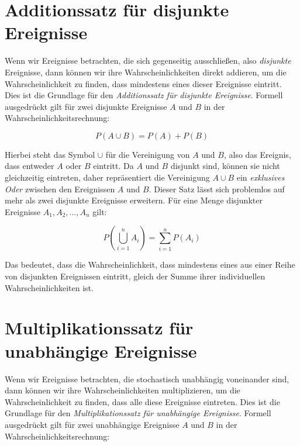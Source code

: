 \section{Additionssatz für disjunkte Ereignisse}
Wenn wir Ereignisse betrachten, die sich gegenseitig ausschließen, also \textit{disjunkte} Ereignisse, dann können wir ihre Wahrscheinlichkeiten direkt addieren, um die Wahrscheinlichkeit zu finden, dass mindestens eines dieser Ereignisse eintritt.
Dies ist die Grundlage für den \textit{Additionssatz für disjunkte Ereignisse}.
\newline \newline
Formell ausgedrückt gilt für zwei disjunkte Ereignisse $A$ und $B$ in der Wahrscheinlichkeitsrechnung:

\begin{equation}
    P(A \cup B) = P(A) + P(B)
\end{equation}

Hierbei steht das Symbol $\cup$ für die Vereinigung von $A$ und $B$, also das Ereignis, dass entweder $A$ oder $B$ eintritt.
Da $A$ und $B$ disjunkt sind, können sie nicht gleichzeitig eintreten, daher repräsentiert die Vereinigung $A \cup B$ ein \textit{exklusives Oder} zwischen den Ereignissen $A$ und $B$.
\newline \newline
Dieser Satz lässt sich problemlos auf mehr als zwei disjunkte Ereignisse erweitern. Für eine Menge disjunkter Ereignisse $A_1, A_2, \dots, A_n$ gilt:

\begin{equation}
    P(\bigcup_{i=1}^{n} A_i) = \sum_{i=1}^{n} P(A_i)
\end{equation}

Das bedeutet, dass die Wahrscheinlichkeit, dass mindestens eines aus einer Reihe von disjunkten Ereignissen eintritt, gleich der Summe ihrer individuellen Wahrscheinlichkeiten ist.


\section{Multiplikationssatz für unabhängige Ereignisse}
Wenn wir Ereignisse betrachten, die stochastisch unabhängig voneinander sind, dann können wir ihre Wahrscheinlichkeiten multiplizieren, um die Wahrscheinlichkeit zu finden, dass alle diese Ereignisse eintreten.
Dies ist die Grundlage für den \textit{Multiplikationssatz für unabhängige Ereignisse}.
\newline \newline
Formell ausgedrückt gilt für zwei unabhängige Ereignisse $A$ und $B$ in der Wahrscheinlichkeitsrechnung:

